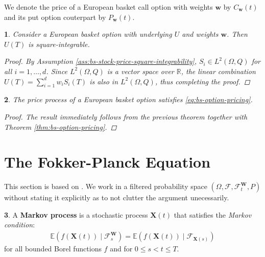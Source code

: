\documentclass[english]{article}
\numberwithin{equation}{section}
\numberwithin{figure}{section}
\theoremstyle{bolddescit}
\newtheorem{theorem}{\protect\theoremname}[section]
\theoremstyle{definition}
\newtheorem{definition}[theorem]{\protect\definitionname}
\theoremstyle{definition}
\theoremstyle{plain}
\theoremstyle{plain}
\newtheorem{corollary}[theorem]{\protect\corollaryname}
\theoremstyle{bolddesc}
\theoremstyle{plain}
\theoremstyle{remark}
\providecommand{\corollaryname}{Corollary}
\providecommand{\definitionname}{Definition}
\providecommand{\theoremname}{Theorem}
\begin{document}
We denote the price of a European basket call option with weights $\mathbf{w}$ by $C_\mathbf{w}(t)$ and its put option couterpart by $P_\mathbf{w}(t)$.

\begin{theorem}
  Consider a European basket option with underlying $U$ and weights $\mathbf{w}$. Then $U(T)$ is square-integrable.

  \begin{proof}
    By Assumption \ref{ass:bs-stock-price-square-integrability}, $S_i \in L^2(\Omega, Q)$ for all $i=1,\ldots,d$. Since $L^2(\Omega, Q)$ is a vector space over $\mathbb{R}$, the linear combination $U(T) = \sum_{i=1}^{d} w_i S_i(T)$ is also in $L^2(\Omega, Q)$, thus completing the proof.
  \end{proof}
\end{theorem}

\begin{corollary}
  The price process of a European basket option satisfies \eqref{eq:bs-option-pricing}.

  \begin{proof}
    The result immediately follows from the previous theorem together with Theorem \ref{thm:bs-option-pricing}.
  \end{proof}
\end{corollary}

\section{The Fokker-Planck Equation}


This section is based on \textcite{pavliotis_stochastic_2014}. We work in a filtered probability space $(\Omega, \mathcal{F}, \mathcal{F}^\mathbf{W}_t, P)$ without stating it explicitly as to not clutter the argument unecessarily.

\begin{definition}
  A \textbf{Markov process} is a stochastic process $\mathbf{X}(t)$ that satisfies the \textit{Markov condition}:
  \begin{align*}
    \mathbb{E}(f(\mathbf{X}(t)) \mid \mathcal{F}^\mathbf{W}_{s})
    = \mathbb{E}(f(\mathbf{X}(t)) \mid \mathcal{F}_{\mathbf{X}(s)})
  \end{align*}
  for all bounded Borel functions $f$ and for $0 \le s < t \le T$.
\end{definition}
\end{document}
